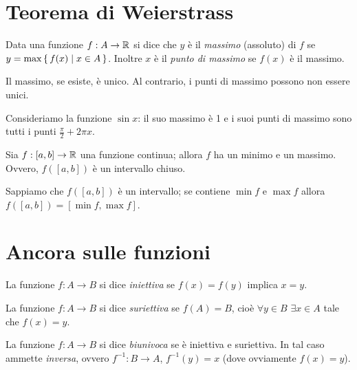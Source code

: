 \section{Teorema di Weierstrass}
\begin{definition}
Data una funzione $f: A \to \mathbb R$ si dice che $y$ è il \emph{massimo} (assoluto) di $f$ se $y = \max \set{f(x) | x \in A}$. Inoltre $x$ è il \emph{punto di massimo} se $f(x)$ è il massimo.
\end{definition}

\begin{remark}
Il massimo, se esiste, è unico. Al contrario, i punti di massimo possono non essere unici.
\end{remark}

\begin{example}
Consideriamo la funzione $\sin x$: il suo massimo è 1 e i suoi punti di massimo sono tutti i punti $\frac{\pi}{2} + 2\pi x$.
\end{example}

\begin{theorem}
Sia $f : [a, b] \to \mathbb R$ una funzione continua; allora $f$ ha un minimo e un massimo. Ovvero, $f([a, b])$ è un intervallo chiuso.
\end{theorem}

Sappiamo che $f([a, b])$ è un intervallo; se contiene $\min f$ e $\max f$ allora $f([a, b]) = [\min f, \max f]$.

\section{Ancora sulle funzioni}

\begin{definition}
La funzione $f: A \to B$ si dice \emph{iniettiva} se $f(x) = f(y)$ implica $x = y$. 
\end{definition}

\begin{definition}
La funzione $f: A \to B$ si dice \emph{suriettiva} se $f(A) = B$, cioè $\forall y \in B$ $\exists x \in A$ tale che $f(x) = y$.
\end{definition}

\begin{definition}
La funzione $f: A \to B$ si dice \emph{biunivoca} se è iniettiva e suriettiva. In tal caso ammette \emph{inversa}, ovvero $f^{-1} : B \to A$, $f^{-1} (y) = x$ (dove ovviamente $f(x) = y$).
\end{definition}

